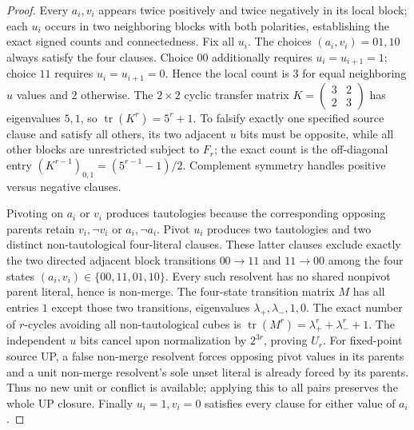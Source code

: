 \documentclass[10pt]{article}
\begin{document}
\begin{proof}
Every $a_i,v_i$ appears twice positively and twice negatively in its local block; each $u_i$ occurs in two neighboring blocks with both polarities, establishing the exact signed counts and connectedness. Fix all $u_i$. The choices $(a_i,v_i)=01,10$ always satisfy the four clauses. Choice $00$ additionally requires $u_i=u_{i+1}=1$; choice $11$ requires $u_i=u_{i+1}=0$. Hence the local count is $3$ for equal neighboring $u$ values and $2$ otherwise. The $2\times2$ cyclic transfer matrix $K=\left(\begin{smallmatrix}3&2\\2&3\end{smallmatrix}\right)$ has eigenvalues $5,1$, so $\operatorname{tr}(K^r)=5^r+1$. To falsify exactly one specified source clause and satisfy all others, its two adjacent $u$ bits must be opposite, while all other blocks are unrestricted subject to $F_r$; the exact count is the off-diagonal entry $(K^{r-1})_{0,1}=(5^{r-1}-1)/2$. Complement symmetry handles positive versus negative clauses.

Pivoting on $a_i$ or $v_i$ produces tautologies because the corresponding opposing parents retain $v_i,\neg v_i$ or $a_i,\neg a_i$. Pivot $u_i$ produces two tautologies and two distinct non-tautological four-literal clauses. These latter clauses exclude exactly the two directed adjacent block transitions $00\to11$ and $11\to00$ among the four states $(a_i,v_i)\in\{00,11,01,10\}$. Every such resolvent has no shared nonpivot parent literal, hence is non-merge. The four-state transition matrix $M$ has all entries $1$ except those two transitions, eigenvalues $\lambda_+,\lambda_-,1,0$. The exact number of $r$-cycles avoiding all non-tautological cubes is $\operatorname{tr}(M^r)=\lambda_+^r+\lambda_-^r+1$. The independent $u$ bits cancel upon normalization by $2^{3r}$, proving $U_r$. For fixed-point source UP, a false non-merge resolvent forces opposing pivot values in its parents and a unit non-merge resolvent's sole unset literal is already forced by its parents. Thus no new unit or conflict is available; applying this to all pairs preserves the whole UP closure. Finally $u_i=1,v_i=0$ satisfies every clause for either value of $a_i$.
\end{proof}
\end{document}
